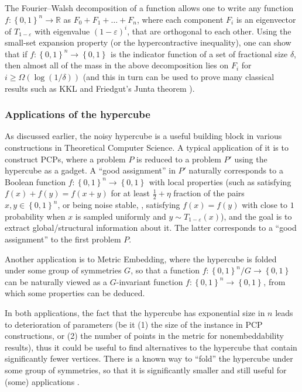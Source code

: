 \documentclass{toc}
\newcommand\set[1]{{\left\{ #1 \right\}}}
\newcommand\power[1]{\set{0,1}^{#1}}
\newcommand\half{\frac{1}{2}}
\newcommand\eps{\varepsilon}
\renewcommand\geq{\geqslant}
\begin{document}
The Fourier--Walsh decomposition of a function allows one to write any function $f\colon \power{n}\to\mathbb{R}$
as $F_0+F_1+\ldots+F_n$, where each component $F_i$ is an eigenvector of $T_{1-\eps}$ with eigenvalue $(1-\eps)^i$, that are orthogonal to each other.
Using the small-set expansion property (or the hypercontractive inequality), one can show that if $f\colon \power{n}\to\power{}$ is the
indicator function of a set of fractional size $\delta$, then almost all of the mass in the above decomposition lies on $F_i$ for $i\geq \Omega(\log(1/\delta))$
(and this in turn can be used to prove many classical results such as KKL and Friedgut's Junta theorem \cite{KKL,Friedgut98}).

\subsubsection{Applications of the hypercube} %
As discussed earlier, the noisy hypercube is a useful building block in various constructions in Theoretical Computer Science. A typical application of it
is to construct PCPs, where a problem $P$ is reduced to a problem $P'$ using the hypercube as a gadget.
A ``good assignment'' in $P'$ naturally corresponds to a Boolean function $f\colon\power{n}\to\power{}$ with local properties (such as
satisfying $f(x) + f(y) = f(x+y)$ for at least $\half + \eta$ fraction of the pairs $x,y\in\power{n}$, or being noise stable, \ie, satisfying $f(x) = f(y)$
with close to $1$ probability when $x$ is sampled uniformly and $y\sim T_{1-\eps}(x)$), and the goal is to extract global/structural information about it.
The latter corresponds to a ``good assignment'' to the first problem $P$.

Another application is to Metric Embedding, where the hypercube is folded under some group of symmetries $G$, so that a function $f\colon \power{n}/ G\to\power{}$
can be naturally viewed as a $G$-invariant function $f\colon\power{n}\to\power{}$, from which some properties can be deduced.

In both applications, the fact that the hypercube has exponential size in $n$ leads to deterioration of parameters (be it (1) the size of the instance in PCP constructions,
or (2) the number of points in the metric for nonembeddability results),
thus it could be useful to find alternatives to the hypercube that contain significantly
%
fewer  %
vertices. There is a known way \cite{BGHMRS}
to ``fold'' the hypercube under some group of symmetries, so that it is significantly smaller and still useful
for (some) %
applications  %
 \cite{kane2013prg,dinur2015pcps}.
%
%
%
%
%
%
%
\end{document}
